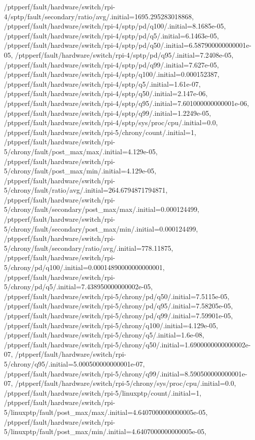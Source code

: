 {    /ptpperf/fault/hardware/switch/rpi-4/sptp/fault/secondary/ratio/avg/.initial=1695.295283018868,
    /ptpperf/fault/hardware/switch/rpi-4/sptp/pd/q100/.initial=8.1685e-05,
    /ptpperf/fault/hardware/switch/rpi-4/sptp/pd/q5/.initial=6.1463e-05,
    /ptpperf/fault/hardware/switch/rpi-4/sptp/pd/q50/.initial=6.587900000000001e-05,
    /ptpperf/fault/hardware/switch/rpi-4/sptp/pd/q95/.initial=7.2408e-05,
    /ptpperf/fault/hardware/switch/rpi-4/sptp/pd/q99/.initial=7.627e-05,
    /ptpperf/fault/hardware/switch/rpi-4/sptp/q100/.initial=0.000152387,
    /ptpperf/fault/hardware/switch/rpi-4/sptp/q5/.initial=1.61e-07,
    /ptpperf/fault/hardware/switch/rpi-4/sptp/q50/.initial=2.147e-06,
    /ptpperf/fault/hardware/switch/rpi-4/sptp/q95/.initial=7.601000000000001e-06,
    /ptpperf/fault/hardware/switch/rpi-4/sptp/q99/.initial=1.2249e-05,
    /ptpperf/fault/hardware/switch/rpi-4/sptp/sys/proc/cpu/.initial=0.0,
    /ptpperf/fault/hardware/switch/rpi-5/chrony/count/.initial=1,
    /ptpperf/fault/hardware/switch/rpi-5/chrony/fault/post_max/max/.initial=4.129e-05,
    /ptpperf/fault/hardware/switch/rpi-5/chrony/fault/post_max/min/.initial=4.129e-05,
    /ptpperf/fault/hardware/switch/rpi-5/chrony/fault/ratio/avg/.initial=264.6794871794871,
    /ptpperf/fault/hardware/switch/rpi-5/chrony/fault/secondary/post_max/max/.initial=0.000124499,
    /ptpperf/fault/hardware/switch/rpi-5/chrony/fault/secondary/post_max/min/.initial=0.000124499,
    /ptpperf/fault/hardware/switch/rpi-5/chrony/fault/secondary/ratio/avg/.initial=778.11875,
    /ptpperf/fault/hardware/switch/rpi-5/chrony/pd/q100/.initial=0.00014890000000000001,
    /ptpperf/fault/hardware/switch/rpi-5/chrony/pd/q5/.initial=7.438950000000002e-05,
    /ptpperf/fault/hardware/switch/rpi-5/chrony/pd/q50/.initial=7.5115e-05,
    /ptpperf/fault/hardware/switch/rpi-5/chrony/pd/q95/.initial=7.58205e-05,
    /ptpperf/fault/hardware/switch/rpi-5/chrony/pd/q99/.initial=7.59901e-05,
    /ptpperf/fault/hardware/switch/rpi-5/chrony/q100/.initial=4.129e-05,
    /ptpperf/fault/hardware/switch/rpi-5/chrony/q5/.initial=1.6e-08,
    /ptpperf/fault/hardware/switch/rpi-5/chrony/q50/.initial=1.6900000000000002e-07,
    /ptpperf/fault/hardware/switch/rpi-5/chrony/q95/.initial=5.000500000000001e-07,
    /ptpperf/fault/hardware/switch/rpi-5/chrony/q99/.initial=8.590500000000001e-07,
    /ptpperf/fault/hardware/switch/rpi-5/chrony/sys/proc/cpu/.initial=0.0,
    /ptpperf/fault/hardware/switch/rpi-5/linuxptp/count/.initial=1,
    /ptpperf/fault/hardware/switch/rpi-5/linuxptp/fault/post_max/max/.initial=4.6407000000000005e-05,
    /ptpperf/fault/hardware/switch/rpi-5/linuxptp/fault/post_max/min/.initial=4.6407000000000005e-05,
}
